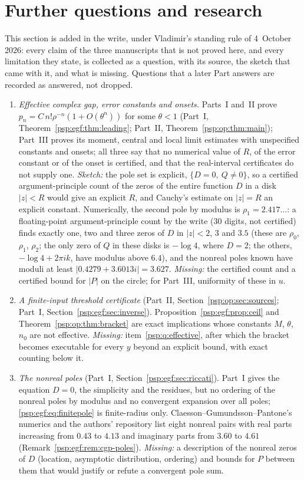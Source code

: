 \documentclass[11pt,letterpaper]{article}
\numberwithin{equation}{section}
\theoremstyle{remark}\newtheorem{remark}[theorem]{Remark}
\begin{document}
\section{Further questions and research}\label{psp:sec:further}
This section is added in the write, under Vladimir's standing rule of 4~October 2026: every claim of the three manuscripts that is not proved here, and every limitation they state, is collected as a question, with its source, the sketch that came with it, and what is missing. Questions that a later Part answers are recorded as answered, not dropped.
\begin{enumerate}
\item\label{psp:q:effective} \emph{Effective complex gap, error constants and onsets.} Parts~I and~II prove $p_n=C\,n!\rho^{-n}(1+O(\theta^n))$ for some $\theta<1$ (Part~I, Theorem~\ref{psp:egf:thm:leading}; Part~II, Theorem~\ref{psp:op:thm:main}); Part~III proves its moment, central and local limit estimates with unspecified constants and onsets; all three say that no numerical value of $R$, of the error constant or of the onset is certified, and that the real-interval certificates do not supply one. \emph{Sketch:} the pole set is explicit, $\{D=0,\ Q\ne0\}$, so a certified argument-principle count of the zeros of the entire function $D$ in a disk $|z|<R$ would give an explicit $R$, and Cauchy's estimate on $|z|=R$ an explicit constant. Numerically, the second pole by modulus is $\rho_1=2.417\ldots$: a floating-point argument-principle count by the write (30 digits, not certified) finds exactly one, two and three zeros of $D$ in $|z|<2$, $3$ and $3.5$ (these are $\rho_0$, $\rho_1$, $\rho_2$; the only zero of $Q$ in these disks is $-\log4$, where $D=2$; the others, $-\log4+2\pi ik$, have modulus above $6.4$), and the nonreal poles known have moduli at least $|0.4279+3.6013i|=3.627$. \emph{Missing:} the certified count and a certified bound for $|P|$ on the circle; for Part~III, uniformity of these in $u$.
\item\label{psp:q:threshold} \emph{A finite-input threshold certificate} (Part~II, Section~\ref{psp:op:sec:sources}; Part~I, Section~\ref{psp:egf:sec:inverse}). Proposition~\ref{psp:egf:prop:ceil} and Theorem~\ref{psp:op:thm:bracket} are exact implications whose constants $M$, $\theta$, $n_0$ are not effective. \emph{Missing:} item~\ref{psp:q:effective}, after which the bracket becomes executable for every $y$ beyond an explicit bound, with exact counting below it.
\item\label{psp:q:nonreal} \emph{The nonreal poles} (Part~I, Section~\ref{psp:egf:sec:riccati}). Part~I gives the equation $D=0$, the simplicity and the residues, but no ordering of the nonreal poles by modulus and no convergent expansion over all poles; \eqref{psp:egf:eq:finitepole} is finite-radius only. Claesson--Gu\dh mundsson--Pantone's numerics and the authors' repository list eight nonreal pairs with real parts increasing from $0.43$ to $4.13$ and imaginary parts from $3.60$ to $4.61$ (Remark~\ref{psp:egf:rem:cgp-poles}). \emph{Missing:} a description of the nonreal zeros of $D$ (location, asymptotic distribution, ordering) and bounds for $P$ between them that would justify or refute a convergent pole sum.

\end{enumerate}
\end{document}
